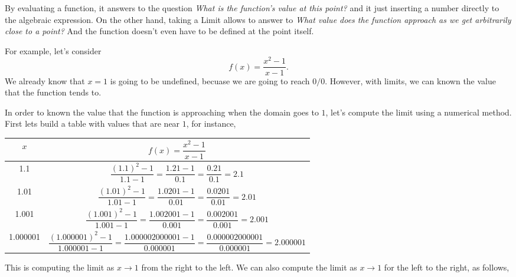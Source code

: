 \documentclass[../main-notes.tex]{subfile}
\begin{document}
By evaluating a function, it answers to the question \emph{What is the function's value at this point?} and it just inserting a number directly to the algebraic expression. 
On the other hand, taking a Limit allows to answer to \emph{What value does the function approach as we get arbitrarily close to a point?}
And the function doesn't even have to be defined at the point itself.

For example, let's consider \[f(x) = \frac{x^2 - 1}{x - 1}.\]
We already know that $x=1$ is going to be undefined, becuase we are going to reach $0/0$.
However, with limits, we can known the value that the function tends to.

In order to known the value that the function is approaching when the domain goes to $1$, let's compute the limit using a numerical method.
First lets build a table with values that are near $1$, for instance,

\begin{table}[h]
\centering
\renewcommand{\arraystretch}{1.4}
\begin{tabular}{@{}cc@{}}
\toprule
\( x \) & \( f(x) = \dfrac{x^2 - 1}{x - 1} \) \\ 
\midrule
1.1 & \( \dfrac{(1.1)^2 - 1}{1.1 - 1} = \dfrac{1.21 - 1}{0.1} = \dfrac{0.21}{0.1} = 2.1 \) \\
1.01 & \( \dfrac{(1.01)^2 - 1}{1.01 - 1} = \dfrac{1.0201 - 1}{0.01} = \dfrac{0.0201}{0.01} = 2.01 \) \\
1.001 & \( \dfrac{(1.001)^2 - 1}{1.001 - 1} = \dfrac{1.002001 - 1}{0.001} = \dfrac{0.002001}{0.001} = 2.001 \) \\
1.000001 & \( \dfrac{(1.000001)^2 - 1}{1.000001 - 1} = \dfrac{1.000002000001 - 1}{0.000001} = \dfrac{0.000002000001}{0.000001} = 2.000001 \) \\
\bottomrule
\end{tabular}
\end{table}

This is computing the limit as $x\to1$ from the right to the left.
We can also compute the limit as $x\to1$ for the left to the right, as follows,
\end{document}

